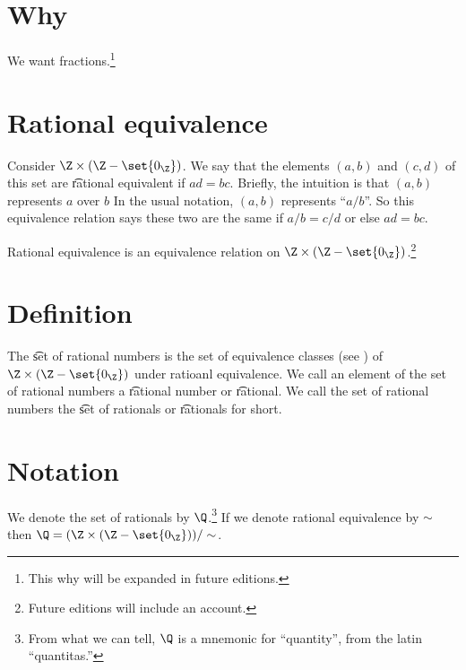 
\section*{Why}

We want fractions.\footnote{This why will be expanded in future editions.}

\section*{Rational equivalence}

Consider $\Z  \times (\Z  - \set{0_{\Z }})$.
We say that the elements $(a, b)$ and $(c, d)$ of this set are \t{rational equivalent} if $ad = bc$.
Brieﬂy, the intuition is that $(a, b)$ represents $a$ over $b$
In the usual notation, $(a, b)$ represents ``$a/b$''.
So this equivalence relation says these two are the same if $a/b = c/d$ or else $ad= bc$.

\begin{proposition}
Rational equivalence is an equivalence relation on $\Z \times (\Z  - \set{0_{\Z }})$.\footnote{Future editions will include an account.}

\end{proposition}

\section*{Definition}

The \t{set of rational numbers} is the set of equivalence classes (see ) of $\Z  \times (\Z  - \set{0_{\Z }})$ under ratioanl equivalence.
We call an element of the set of rational numbers a \t{rational number} or \t{rational}.
We call the set of rational numbers the \t{set of rationals} or \t{rationals} for short.

\section*{Notation}

We denote the set of rationals by $\Q $.\footnote{From what we can tell, $\Q $ is a mnemonic for ``quantity'', from the latin ``quantitas.''}
If we denote rational equivalence by $\sim$ then $\Q  = (\Z \times (\Z  - \set{0_{\Z }}))/\sim$.

\blankpage
